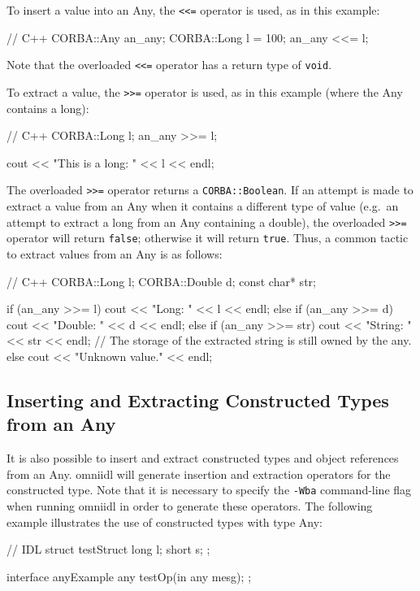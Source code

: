 \documentclass[11pt,twoside,a4paper]{book}
\newcommand{\type}[1]{\texttt{#1}}
\newcommand{\code}[1]{\texttt{#1}}
\begin{document}
To insert a value into an Any, the \code{<{}<=} operator is used, as
in this example:

\begin{cxxlisting}
// C++
CORBA::Any an_any;
CORBA::Long l = 100;
an_any <<= l;
\end{cxxlisting}

\noindent Note that the overloaded \code{<{}<=} operator has a return
type of \type{void}.

To extract a value, the \code{>{}>=} operator is used, as in this
example (where the Any contains a long):

\begin{cxxlisting}
// C++
CORBA::Long l;
an_any >>= l;

cout << "This is a long: " << l << endl;
\end{cxxlisting}


The overloaded \code{>{}>=} operator returns a \type{CORBA::Boolean}.
If an attempt is made to extract a value from an Any when it contains
a different type of value (e.g.\ an attempt to extract a long from an
Any containing a double), the overloaded \code{>{}>=} operator will
return \code{false}; otherwise it will return \code{true}. Thus, a
common tactic to extract values from an Any is as follows:

\begin{cxxlisting}
// C++
CORBA::Long l;
CORBA::Double d;
const char* str;

if (an_any >>= l) {
  cout << "Long: " << l << endl;
}
else if (an_any >>= d) {
  cout << "Double: " << d << endl;
}
else if (an_any >>= str) {
  cout << "String: " << str << endl;
  // The storage of the extracted string is still owned by the any.
}
else {
  cout << "Unknown value." << endl;
}
\end{cxxlisting}


\subsection{Inserting and Extracting Constructed Types from an Any}

It is also possible to insert and extract constructed types and object
references from an Any. omniidl will generate insertion and extraction
operators for the constructed type. Note that it is necessary to
specify the \texttt{-Wba} command-line flag when running omniidl in
order to generate these operators. The following example illustrates
the use of constructed types with type Any:

\begin{idllisting}
// IDL
struct testStruct {
  long l;
  short s;
};

interface anyExample {
  any testOp(in any mesg);
};
\end{idllisting}
\end{document}
